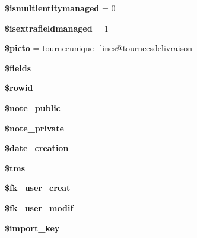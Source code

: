 \begin{DoxyCompactItemize}
\mbox{\label{classTourneeUnique__lines_a4f6192784e756e795fb75c609061c6fb}} 
{\bfseries \$ismultientitymanaged} = 0
\item 
\mbox{\label{classTourneeUnique__lines_a26ac6d752ad46a9e2faabc96e66f8427}} 
{\bfseries \$isextrafieldmanaged} = 1
\item 
\mbox{\label{classTourneeUnique__lines_aee9d5a146d9fb310f7528312000964cb}} 
{\bfseries \$picto} = \textquotesingle{}tourneeunique\+\_\+lines@tourneesdelivraison\textquotesingle{}
\item 
{\bfseries \$fields}
\item 
\mbox{\label{classTourneeUnique__lines_ae35a50d591af8c1762722dc3f1dd789b}} 
{\bfseries \$rowid}
\item 
\mbox{\label{classTourneeUnique__lines_a1cd3fe0c325fd41f6ae4c871aff19183}} 
{\bfseries \$note\+\_\+public}
\item 
\mbox{\label{classTourneeUnique__lines_af36b271e7c83391555c6f417a52d60b5}} 
{\bfseries \$note\+\_\+private}
\item 
\mbox{\label{classTourneeUnique__lines_a13535856257d2902c313c7433d99f662}} 
{\bfseries \$date\+\_\+creation}
\item 
\mbox{\label{classTourneeUnique__lines_ad669582230df6521fdb83c190d556c89}} 
{\bfseries \$tms}
\item 
\mbox{\label{classTourneeUnique__lines_aa1b805e7e9897fdee4023626c531238e}} 
{\bfseries \$fk\+\_\+user\+\_\+creat}
\item 
\mbox{\label{classTourneeUnique__lines_a662214c6a2e6539f0406e93258dfa749}} 
{\bfseries \$fk\+\_\+user\+\_\+modif}
\item 
\mbox{\label{classTourneeUnique__lines_a4035f00aa2b5c14a9cef40de91059f4e}} 
{\bfseries \$import\+\_\+key}
\item 

\end{DoxyCompactItemize}
